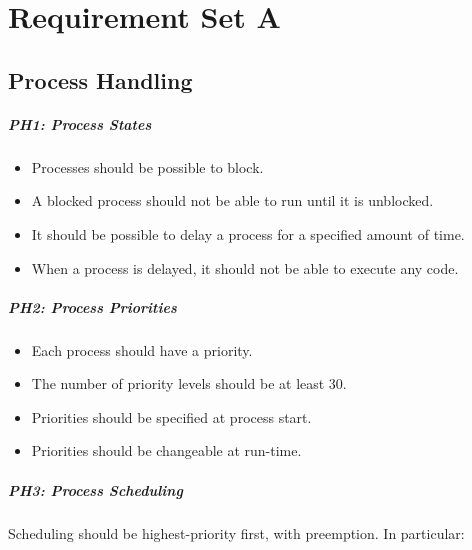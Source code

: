 \chapter{Requirement Set A}
\label{ch:setA}

\section{Process Handling}
\label{se:process_handling}

\paragraph*{PH1: Process States}
\label{pg:ph1}

\begin{itemize}
  \item Processes should be possible to block.
  \item  A blocked process should not be able to run until it is unblocked.
  \item  It should be possible to delay a process for a specified amount of time.
  \item  When a process is delayed, it should not be able to execute any code.
\end{itemize}

\paragraph*{PH2: Process Priorities}
\label{pg:ph2}

\begin{itemize}
  \item Each process should have a priority.
  \item  The number of priority levels should be at least 30.
  \item  Priorities should be specified at process start.
  \item  Priorities should be changeable at run-time.
\end{itemize}

\paragraph*{PH3: Process Scheduling}
\label{pg:ph3}

Scheduling should be highest-priority first, with preemption. In particular:

